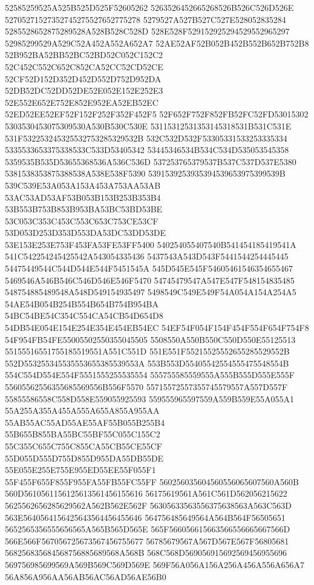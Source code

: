 52585259525A525B525D525F52605262
5263526452665268526B526C526D526E
52705271527352745275527652775278
5279527A527B527C527E528052835284
5285528652875289528A528B528C528D
528E528F529152925294529552965297
52985299529A529C52A452A552A652A7
52AE52AF52B052B452B552B652B752B8
52B952BA52BB52BC52BD52C052C152C2
52C452C552C652C852CA52CC52CD52CE
52CF52D152D352D452D552D752D952DA
52DB52DC52DD52DE52E052E152E252E3
52E552E652E752E852E952EA52EB52EC
52ED52EE52EF52F152F252F352F452F5
52F652F752F852FB52FC52FD53015302
5303530453075309530A530B530C530E
53115312531353145318531B531C531E
531F532253245325532753285329532B
532C532D532F53305331533253335334
5335533653375338533C533D53405342
53445346534B534C534D535053545358
5359535B535D53655368536A536C536D
537253765379537B537C537D537E5380
5381538353875388538A538E538F5390
5391539253935394539653975399539B
539C539E53A053A153A453A753AA53AB
53AC53AD53AF53B053B153B253B353B4
53B553B753B853B953BA53BC53BD53BE
53C053C353C453C553C653C753CE53CF
53D053D253D353D553DA53DC53DD53DE
53E153E253E753F453FA53FE53FF5400
540254055407540B541454185419541A
541C542254245425542A543054335436
5437543A543D543F5441544254445445
54475449544C544D544E544F5451545A
545D545E545F54605461546354655467
5469546A546B546C546D546E546F5470
54745479547A547E547F548154835485
548754885489548A548D549154935497
5498549C549E549F54A054A154A254A5
54AE54B054B254B554B654B754B954BA
54BC54BE54C354C554CA54CB54D654D8
54DB54E054E154E254E354E454EB54EC
54EF54F054F154F454F554F654F754F8
54F954FB54FE55005502550355045505
5508550A550B550C550D550E55125513
55155516551755185519551A551C551D
551E551F55215525552655285529552B
552D553255345535553655385539553A
553B553D55405542554555475548554B
554C554D554E554F5551555255535554
555755585559555A555B555D555E555F
55605562556355685569556B556F5570
55715572557355745579557A557D557F
55855586558C558D558E559055925593
559555965597559A559B559E55A055A1
55A255A355A455A555A655A855A955AA
55AB55AC55AD55AE55AF55B055B255B4
55B655B855BA55BC55BF55C055C155C2
55C355C655C755C855CA55CB55CE55CF
55D055D555D755D855D955DA55DB55DE
55E055E255E755E955ED55EE55F055F1
55F455F655F855F955FA55FB55FC55FF
560256035604560556065607560A560B
560D5610561156125613561456155616
56175619561A561C561D562056215622
5625562656285629562A562B562E562F
56305633563556375638563A563C563D
563E5640564156425643564456455646
564756485649564A564B564F56505651
5652565356555656565A565B565D565E
565F566056615663566556665667566D
566E566F567056725673567456755677
56785679567A567D567E567F56805681
568256835684568756885689568A568B
568C568D569056915692569456955696
569756985699569A569B569C569D569E
569F56A056A156A256A456A556A656A7
56A856A956AA56AB56AC56AD56AE56B0
